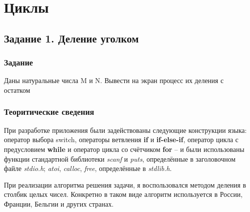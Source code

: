 \documentclass[12pt,a4paper]{report}
\begin{document}
\chapter{Циклы}
\section{Задание 1. Деление уголком}
\subsection{Задание}
\hspace{\parindent}
Даны натуральные числа M и N. Вывести на экран процесс их деления с остатком
\subsection{Теоритические сведения}
\hspace{\parindent}
При разработке приложения были задействованы следующие конструкции языка: оператор выбора switch, операторы ветвления \textbf{if} и \textbf{if-else-if}, оператор цикла с предусловием \textbf{while} и оператор цикла со счётчиком \textbf{for} -- и были использованы функции стандартной библиотеки \textit{scanf} и \textit{puts}, определённые в заголовочном файле \textit{stdio.h}; \textit{atoi}, \textit{calloc}, \textit{free}, определённые в \textit{stdlib.h}.

\hspace{\parindent}
При реализации алгоритма решения задачи, я воспользовался методом деления в столбик целых чисел. Конкретно в таком виде алгоритм используется в России, Франции, Бельгии и других странах.
\end{document}
